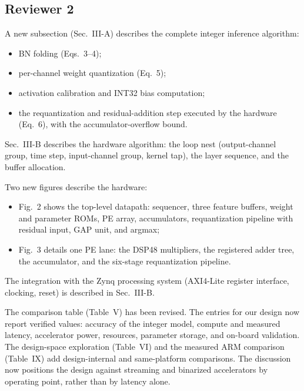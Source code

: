 \documentclass[10pt,a4paper]{article}
\begin{document}
\subsection*{Reviewer 2}

A new subsection (Sec.~III-A) describes the complete integer inference algorithm:
\begin{itemize}
  \item BN folding (Eqs.~3--4);
  \item per-channel weight quantization (Eq.~5);
  \item activation calibration and INT32 bias computation;
  \item the requantization and residual-addition step executed by the hardware (Eq.~6), with the
  accumulator-overflow bound.
\end{itemize}
Sec.~III-B describes the hardware algorithm: the loop nest (output-channel group, time step,
input-channel group, kernel tap), the layer sequence, and the buffer allocation.

Two new figures describe the hardware:
\begin{itemize}
  \item Fig.~2 shows the top-level datapath: sequencer, three feature buffers, weight and parameter
  ROMs, PE array, accumulators, requantization pipeline with residual input, GAP unit, and
  argmax;
  \item Fig.~3 details one PE lane: the DSP48 multipliers, the registered adder tree, the
  accumulator, and the six-stage requantization pipeline.
\end{itemize}
The integration with the Zynq processing system (AXI4-Lite register interface, clocking,
reset) is described in Sec.~III-B.

The comparison table (Table~V) has been revised. The entries for our design now report verified
values: accuracy of the integer model, compute and measured latency, accelerator power,
resources, parameter storage, and on-board validation. The design-space exploration (Table~VI)
and the measured ARM comparison (Table~IX) add design-internal and same-platform comparisons.
The discussion now positions the design against streaming and binarized accelerators by
operating point, rather than by latency alone.
\end{document}
